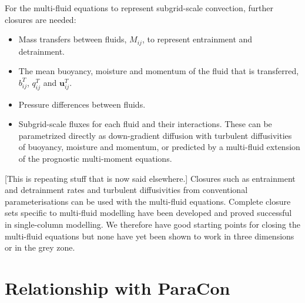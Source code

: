 \documentclass[11pt,a4paper]{article}
\begin{document}
For the multi-fluid equations to represent subgrid-scale convection, further closures are needed:\hspace{-1in}
\begin{itemize}
\item Mass transfers between fluids, $M_{ij}$, to represent entrainment and detrainment.
\item The mean buoyancy, moisture and momentum of the fluid that is transferred, $b_{ij}^T$, $q_{ij}^T$ and $\mathbf{u}_{ij}^T$. 
\item Pressure differences between fluids.
\item Subgrid-scale fluxes for each fluid and their interactions. These can be parametrized directly as down-gradient diffusion with turbulent diffusivities of buoyancy, moisture and momentum, or predicted by a multi-fluid extension of the prognostic multi-moment equations.

\end{itemize}
{\color{red} [This is repeating stuff that is now said elsewhere.]
Closures such as entrainment and detrainment rates and turbulent diffusivities from conventional parameterisations can be used with the multi-fluid equations. Complete closure sets specific to multi-fluid modelling have been developed \cite[]{WMS20,TEB19} and proved successful in single-column modelling. We therefore have good starting points for closing the multi-fluid equations but none have yet been shown to work in three dimensions or in the grey zone. }


\section{Relationship with ParaCon}
\end{document}
